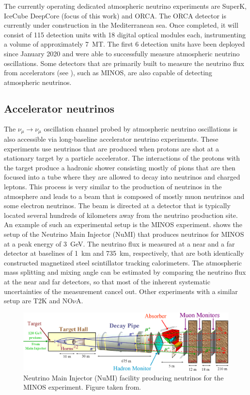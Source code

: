 The currently operating dedicated atmospheric neutrino experiments are SuperK, IceCube DeepCore (focus of this work) and ORCA\cite{km3net_2016}.
The ORCA detector is currently under construction in the Mediterranean sea.
Once completed, it will consist of 115 detection units with 18 digital optical modules each, instrumenting a volume of approximately \SI{7}{MT}.
The first 6 detection units have been deployed since January 2020 and were able to successfully measure atmospheric neutrino oscillations\cite{Nauta:20213J}.
Some detectors that are primarily built to measure the neutrino flux from accelerators (see ), such as MINOS, are also capable of detecting atmospheric neutrinos\cite{MINOS:2005iiy}.

\subsection{Accelerator neutrinos}
The $\nu_\mu \rightarrow \nu_\mu$ oscillation channel probed by atmospheric neutrino oscillations is also accessible via long-baseline accelerator neutrino experiments.
These experiments use neutrinos that are produced when protons are shot at a stationary target by a particle accelerator.
The interactions of the protons with the target produce a hadronic shower consisting mostly of pions that are then focused into a tube where they are allowed to decay into neutrinos and charged leptons.
This process is very similar to the production of neutrinos in the atmosphere and leads to a beam that is composed of mostly muon neutrinos and some electron neutrinos.
The beam is directed at a detector that is typically located several hundreds of kilometers away from the neutrino production site.
An example of such an experimental setup is the MINOS experiment\cite{MICHAEL2008190}.
 shows the setup of the Neutrino Main Injector (NuMI) that produces neutrinos for MINOS at a peak energy of \SI{3}{GeV}.
The neutrino flux is measured at a near and a far detector at baselines of \SI{1}{km} and \SI{735}{km}, respectively, that are both identically constructed magnetized steel scintillator tracking calorimeters.
The atmospheric mass splitting and mixing angle can be estimated by comparing the neutrino flux at the near and far detectors, so that most of the inherent systematic uncertainties of the measurement cancel out.
Other experiments with a similar setup are T2K\cite{T2K:2011qtm} and NO$\nu$A\cite{Patterson:2012zs}.
\begin{figure}
    \centering
    \includegraphics{figures/theory/numi_beam.png}
    \caption{Neutrino Main Injector (NuMI) facility producing neutrinos for the MINOS experiment. Figure taken from\cite{osti_879065}.\label{fig:numi-beam}}
\end{figure}

